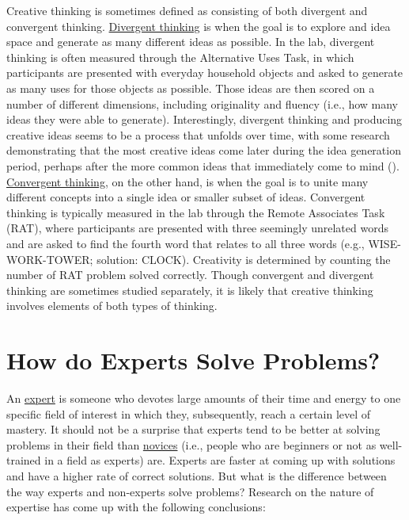 \documentclass[
]{krantz}
\begin{document}
Creative thinking is sometimes defined as consisting of both divergent and convergent thinking. \hyperref[divergent-thinking]{Divergent thinking} is when the goal is to explore and idea space and generate as many different ideas as possible. In the lab, divergent thinking is often measured through the Alternative Uses Task, in which participants are presented with everyday household objects and asked to generate as many uses for those objects as possible. Those ideas are then scored on a number of different dimensions, including originality and fluency (i.e., how many ideas they were able to generate). Interestingly, divergent thinking and producing creative ideas seems to be a process that unfolds over time, with some research demonstrating that the most creative ideas come later during the idea generation period, perhaps after the more common ideas that immediately come to mind (). \hyperref[convergent-thinking]{Convergent thinking}, on the other hand, is when the goal is to unite many different concepts into a single idea or smaller subset of ideas. Convergent thinking is typically measured in the lab through the Remote Associates Task (RAT), where participants are presented with three seemingly unrelated words and are asked to find the fourth word that relates to all three words (e.g., WISE-WORK-TOWER; solution: CLOCK). Creativity is determined by counting the number of RAT problem solved correctly. Though convergent and divergent thinking are sometimes studied separately, it is likely that creative thinking involves elements of both types of thinking.

\section{How do Experts Solve Problems?}\label{how-do-experts-solve-problems}

An \hyperref[expert]{expert} is someone who devotes large amounts of their time and energy to one specific field of interest in which they, subsequently, reach a certain level of mastery. It should not be a surprise that experts tend to be better at solving problems in their field than \href{novice}{novices} (i.e., people who are beginners or not as well-trained in a field as experts) are. Experts are faster at coming up with solutions and have a higher rate of correct solutions. But what is the difference between the way experts and non-experts solve problems? Research on the nature of expertise has come up with the following conclusions:
\end{document}
